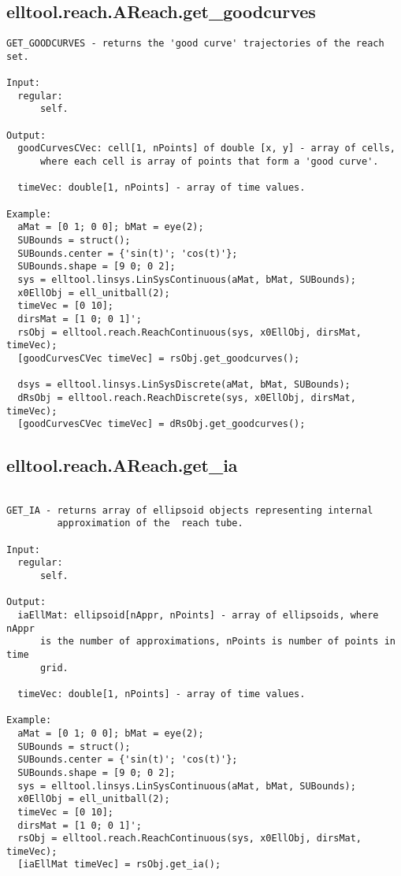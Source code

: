 \subsection{\texorpdfstring{elltool.reach.AReach.get\_goodcurves}{get\_goodcurves}}\label{method:elltool.reach.AReach.getgoodcurves}
\begin{verbatim}
GET_GOODCURVES - returns the 'good curve' trajectories of the reach set.

Input:
  regular:
      self.

Output:
  goodCurvesCVec: cell[1, nPoints] of double [x, y] - array of cells,
      where each cell is array of points that form a 'good curve'.

  timeVec: double[1, nPoints] - array of time values.

Example:
  aMat = [0 1; 0 0]; bMat = eye(2);
  SUBounds = struct();
  SUBounds.center = {'sin(t)'; 'cos(t)'};
  SUBounds.shape = [9 0; 0 2];
  sys = elltool.linsys.LinSysContinuous(aMat, bMat, SUBounds);
  x0EllObj = ell_unitball(2);
  timeVec = [0 10];
  dirsMat = [1 0; 0 1]';
  rsObj = elltool.reach.ReachContinuous(sys, x0EllObj, dirsMat, timeVec);
  [goodCurvesCVec timeVec] = rsObj.get_goodcurves();

  dsys = elltool.linsys.LinSysDiscrete(aMat, bMat, SUBounds);
  dRsObj = elltool.reach.ReachDiscrete(sys, x0EllObj, dirsMat, timeVec);
  [goodCurvesCVec timeVec] = dRsObj.get_goodcurves();
\end{verbatim}
\subsection{\texorpdfstring{elltool.reach.AReach.get\_ia}{get\_ia}}\label{method:elltool.reach.AReach.getia}
\begin{verbatim}

GET_IA - returns array of ellipsoid objects representing internal
         approximation of the  reach tube.

Input:
  regular:
      self.

Output:
  iaEllMat: ellipsoid[nAppr, nPoints] - array of ellipsoids, where nAppr
      is the number of approximations, nPoints is number of points in time
      grid.

  timeVec: double[1, nPoints] - array of time values.

Example:
  aMat = [0 1; 0 0]; bMat = eye(2);
  SUBounds = struct();
  SUBounds.center = {'sin(t)'; 'cos(t)'};
  SUBounds.shape = [9 0; 0 2];
  sys = elltool.linsys.LinSysContinuous(aMat, bMat, SUBounds);
  x0EllObj = ell_unitball(2);
  timeVec = [0 10];
  dirsMat = [1 0; 0 1]';
  rsObj = elltool.reach.ReachContinuous(sys, x0EllObj, dirsMat, timeVec);
  [iaEllMat timeVec] = rsObj.get_ia();
\end{verbatim}
